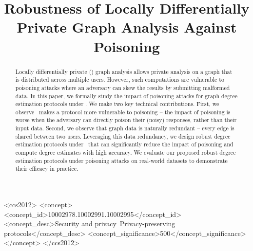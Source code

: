 \documentclass[sigconf]{acmart}
\begin{document}
\title{Robustness of Locally Differentially Private Graph Analysis Against Poisoning}



\begin{abstract}
 Locally differentially private (\ldp) graph analysis allows private analysis on a graph that is distributed across multiple users.  However, such computations are vulnerable to poisoning attacks where an adversary can skew the results by submitting malformed data. In this paper, we formally study the impact of poisoning attacks for graph degree estimation protocols under \ldp. We make two key technical contributions. First, we observe \ldp~makes a protocol more vulnerable to poisoning -- the impact of poisoning is worse when the adversary can directly poison their (noisy) responses, rather than their input data. Second, we observe that graph data is naturally redundant -- every edge is shared between two users. Leveraging this data redundancy, we design robust degree estimation protocols under \ldp~that can significantly reduce the impact of poisoning and compute degree estimates with high accuracy.  We evaluate our proposed robust degree estimation protocols under poisoning attacks on real-world datasets to demonstrate their efficacy in practice. 
\end{abstract}

\begin{CCSXML}
<ccs2012>
<concept>
<concept_id>10002978.10002991.10002995</concept_id>
<concept_desc>Security and privacy~Privacy-preserving protocols</concept_desc>
<concept_significance>500</concept_significance>
</concept>
</ccs2012>
\end{CCSXML}


\end{document}

